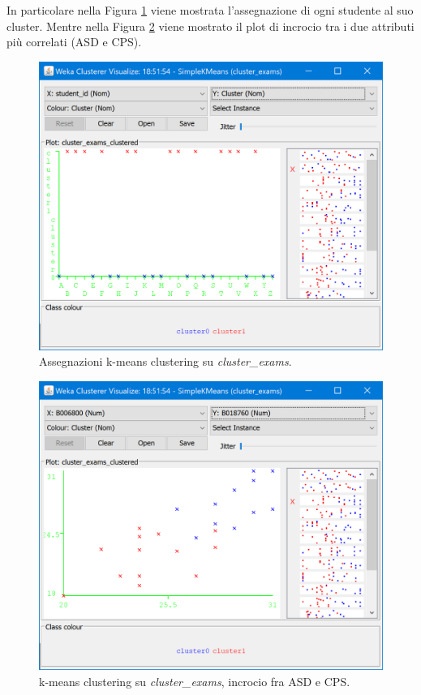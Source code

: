 \documentclass[]{article}
\begin{document}
In particolare nella Figura \ref{fig:10} viene mostrata l'assegnazione di ogni studente al suo cluster. Mentre nella Figura \ref{fig:11} viene mostrato il plot di incrocio tra i due attributi pi\`{u} correlati (ASD e CPS).

\begin{figure}[!]
	\centering
	\includegraphics[scale=0.6]{Img/kmeans_exams_assegnamenti.png}
	\caption{Assegnazioni k-means clustering su \textit{cluster\_exams}.
		\label{fig:10}}
\end{figure} 

\begin{figure}[!]
	\centering
	\includegraphics[scale=0.6]{Img/kmeans_exams_incrocio.png}
	\caption{k-means clustering su \textit{cluster\_exams}, incrocio fra ASD e CPS.
		\label{fig:11}}
\end{figure} 
\end{document}
